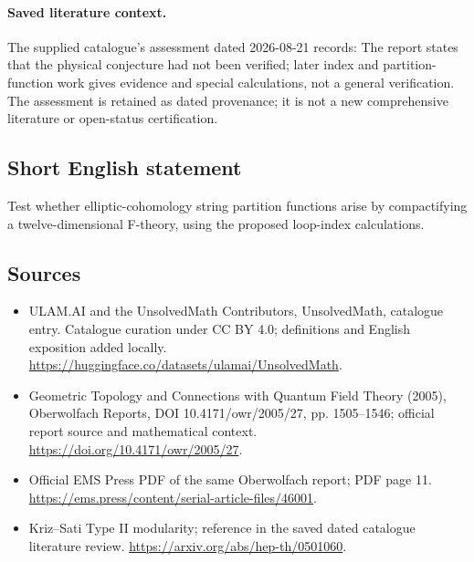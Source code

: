 \documentclass[11pt]{article}
\begin{document}
\paragraph{Saved literature context.} The supplied catalogue's assessment dated 2026-08-21 records: The report states that the physical conjecture had not been verified; later index and partition-function work gives evidence and special calculations, not a general verification. The assessment is retained as dated provenance; it is not a new comprehensive literature or open-status certification.
\subsection{Short English statement}
Test whether elliptic-cohomology string partition functions arise by compactifying a twelve-dimensional F-theory, using the proposed loop-index calculations.
\subsection{Sources}
\begin{itemize}
\item[\hypertarget{source:statement:1}{S1}] ULAM.AI and the UnsolvedMath Contributors, UnsolvedMath, catalogue entry. Catalogue curation under CC BY 4.0; definitions and English exposition added locally.
\url{https://huggingface.co/datasets/ulamai/UnsolvedMath}.
\item[\hypertarget{source:statement:2}{S2}] Geometric Topology and Connections with Quantum Field Theory (2005), Oberwolfach Reports, DOI 10.4171/owr/2005/27, pp. 1505--1546; official report source and mathematical context.
\url{https://doi.org/10.4171/owr/2005/27}.
\item[\hypertarget{source:statement:3}{S3}] Official EMS Press PDF of the same Oberwolfach report; PDF page 11.
\url{https://ems.press/content/serial-article-files/46001}.
\item[\hypertarget{source:statement:4}{S4}] Kriz--Sati Type II modularity; reference in the saved dated catalogue literature review.
\url{https://arxiv.org/abs/hep-th/0501060}.
\end{itemize}
\label{end:statement}
\end{document}
